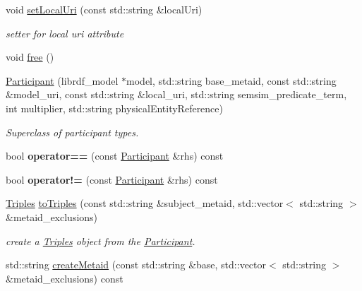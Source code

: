 \begin{DoxyCompactItemize}
\mbox{\label{classomexmeta_1_1Participant_a595323ae0681f42a7ba5981e2ee840f1}} 
void \hyperlink{classomexmeta_1_1Participant_a595323ae0681f42a7ba5981e2ee840f1}{set\+Local\+Uri} (const std\+::string \&local\+Uri)
\begin{DoxyCompactList}\small\item\em setter for local uri attribute \end{DoxyCompactList}\item 
void \hyperlink{classomexmeta_1_1Participant_a395bc8d2561149a77371ed80e2ed1517}{free} ()
\item 
\hyperlink{classomexmeta_1_1Participant_a95c8c86650d1b0d31bb47eb618ff81b9}{Participant} (librdf\+\_\+model $\ast$model, std\+::string base\+\_\+metaid, const std\+::string \&model\+\_\+uri, const std\+::string \&local\+\_\+uri, std\+::string semsim\+\_\+predicate\+\_\+term, int multiplier, std\+::string physical\+Entity\+Reference)
\begin{DoxyCompactList}\small\item\em Superclass of participant types. \end{DoxyCompactList}\item 
\mbox{\label{classomexmeta_1_1Participant_ad3db317039b403fdb7728885152cbeda}} 
bool {\bfseries operator==} (const \hyperlink{classomexmeta_1_1Participant}{Participant} \&rhs) const
\item 
\mbox{\label{classomexmeta_1_1Participant_aa4baa62cb4ccffe8443262382490328d}} 
bool {\bfseries operator!=} (const \hyperlink{classomexmeta_1_1Participant}{Participant} \&rhs) const
\item 
\hyperlink{classomexmeta_1_1Triples}{Triples} \hyperlink{classomexmeta_1_1Participant_a6757eea8a56972eb369e0e102ae5bfc8}{to\+Triples} (const std\+::string \&subject\+\_\+metaid, std\+::vector$<$ std\+::string $>$ \&metaid\+\_\+exclusions)
\begin{DoxyCompactList}\small\item\em create a \hyperlink{classomexmeta_1_1Triples}{Triples} object from the \hyperlink{classomexmeta_1_1Participant}{Participant}. \end{DoxyCompactList}\item 
std\+::string \hyperlink{classomexmeta_1_1Participant_a03a1ffc7e9efaed5c0e94a62f7c72650}{create\+Metaid} (const std\+::string \&base, std\+::vector$<$ std\+::string $>$ \&metaid\+\_\+exclusions) const

\end{DoxyCompactItemize}
